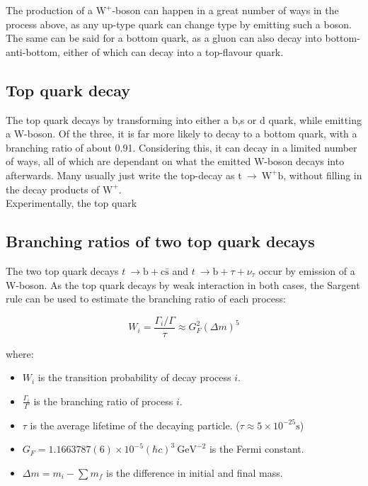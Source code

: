 \documentclass[11pt,a4paper]{article}
\begin{document}
The production of a $\text{W}^+$-boson can happen in a great number of ways in the process above, as any up-type quark can change type by emitting such a boson. The same can be said for a bottom quark, as a gluon can also decay into bottom-anti-bottom, either of which can decay into a top-flavour quark.

\subsection{Top quark decay}
The top quark decays by transforming into either a b,s or d quark, while emitting a W-boson. Of the three, it is far more likely to decay to a bottom quark, with a branching ratio of about 0.91. Considering this, it can decay in a limited number of ways, all of which are dependant on what the emitted W-boson decays into afterwards. Many usually just write the top-decay as $\text{t} \:\rightarrow\: \text{W}^+\text{b}$, without filling in the decay products of $\text{W}^+$.\\

Experimentally, the top quark 

\subsection{Branching ratios of two top quark decays}
The two top quark decays $t\:\rightarrow\text{b}+\text{c}\bar{\text{s}}$ and $t\:\rightarrow\text{b}+\tau+\nu_\tau$ occur by emission of a W-boson. As the top quark decays by weak interaction in both cases, the Sargent rule can be used to estimate the branching ratio of each process:

\begin{equation}
W_i = \frac{\Gamma_i/\Gamma}{\tau} \approx G_F^2 (\Delta m)^5
\end{equation}

where:

\begin{itemize}
	\item $W_i$ is the transition probability of decay process $i$.
	\item $\frac{\Gamma_i}{\Gamma}$ is the branching ratio of process $i$.
	\item $\tau$ is the average lifetime of the decaying particle. ($\tau \approx 5\times10^{-25}\text{s}$)
	\item $G_F = 1.1663787(6)\times 10^{-5}(\hbar c)^3\:\text{GeV}^{-2}$ is the Fermi constant.
	\item $\Delta m = m_i - \sum m_f$ is the difference in initial and final mass.
\end{itemize}
\end{document}
